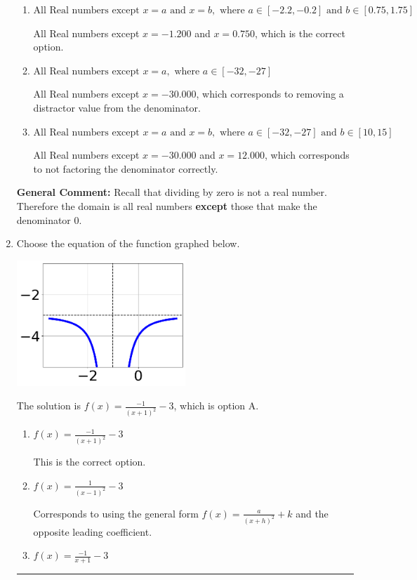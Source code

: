 \documentclass{extbook}[14pt]
\newcommand{\litem}[1]{\item #1

\rule{\textwidth}{0.4pt}}
\begin{document}
\begin{enumerate}
{\begin{enumerate}[label=\Alph*.]
This corresponds to thinking the denominator has complex roots or that rational functions have a domain of all Real numbers.
\item \( \text{All Real numbers except } x = a \text{ and } x = b, \text{ where } a \in [-2.2, -0.2] \text{ and } b \in [0.75, 1.75] \)

All Real numbers except $x = -1.200$ and $x = 0.750$, which is the correct option.
\item \( \text{All Real numbers except } x = a, \text{ where } a \in [-32, -27] \)

All Real numbers except $x = -30.000$, which corresponds to removing a distractor value from the denominator.
\item \( \text{All Real numbers except } x = a \text{ and } x = b, \text{ where } a \in [-32, -27] \text{ and } b \in [10, 15] \)

All Real numbers except $x = -30.000$ and $x = 12.000$, which corresponds to not factoring the denominator correctly.
\end{enumerate}

\textbf{General Comment:} Recall that dividing by zero is not a real number. Therefore the domain is all real numbers \textbf{except} those that make the denominator 0.
}
\litem{
Choose the equation of the function graphed below.

\begin{center}
    \includegraphics[width=0.5\textwidth]{../Figures/rationalGraphToEquationCopyC.png}
\end{center}


The solution is \( f(x) = \frac{-1}{(x + 1)^2} - 3 \), which is option A.\begin{enumerate}[label=\Alph*.]
\item \( f(x) = \frac{-1}{(x + 1)^2} - 3 \)

This is the correct option.
\item \( f(x) = \frac{1}{(x - 1)^2} - 3 \)

Corresponds to using the general form $f(x) = \frac{a}{(x+h)^2}+k$ and the opposite leading coefficient.
\item \( f(x) = \frac{-1}{x + 1} - 3 \)


\end{enumerate}}
\end{enumerate}
\end{document}
